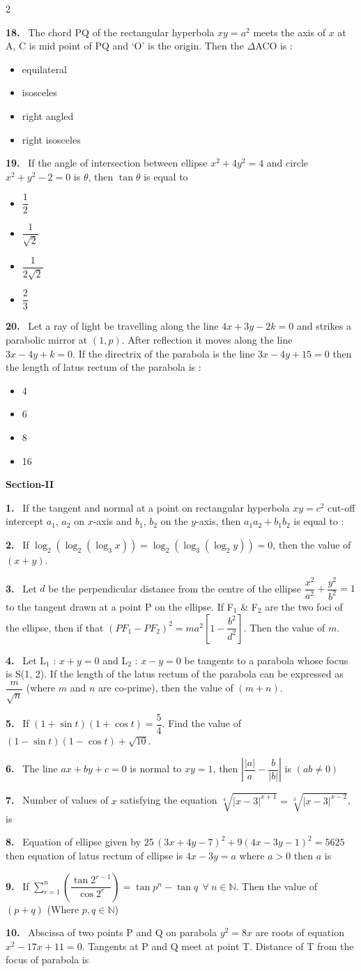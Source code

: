 \documentclass[10pt]{extarticle}
\newcommand{\sect}[1]{\par\smallskip\noindent\textbf{#1}\par}
\newcommand{\qn}[1]{\par\smallskip\noindent\textbf{#1.}~}
\newenvironment{qoptions}{\begin{itemize}[leftmargin=1.8em,itemsep=1pt,topsep=2pt,label={}]}{\end{itemize}}
\newcommand{\opt}[2]{\item[(#1)] #2}
\begin{document}
\begin{multicols}{2}
\qn{18} The chord PQ of the rectangular hyperbola $xy=a^2$ meets the axis of $x$ at A, C is mid point of PQ and `O' is the origin. Then the $\Delta$ACO is :
\begin{qoptions}
\opt{A}{equilateral}
\opt{B}{isosceles}
\opt{C}{right angled}
\opt{D}{right isosceles}
\end{qoptions}
\qn{19} If the angle of intersection between ellipse $x^2+4y^2=4$ and circle $x^2+y^2-2=0$ is $\theta$, then $\tan\theta$ is equal to
\begin{qoptions}
\opt{A}{$\dfrac12$}
\opt{B}{$\dfrac1{\sqrt2}$}
\opt{C}{$\dfrac1{2\sqrt2}$}
\opt{D}{$\dfrac23$}
\end{qoptions}
\qn{20} Let a ray of light be travelling along the line $4x+3y-2k=0$ and strikes a parabolic mirror at $(1,p)$. After reflection it moves along the line $3x-4y+k=0$. If the directrix of the parabola is the line $3x-4y+15=0$ then the length of latus rectum of the parabola is :
\begin{qoptions}
\opt{A}{4}
\opt{B}{6}
\opt{C}{8}
\opt{D}{16}
\end{qoptions}
\sect{Section-II}
\qn{1} If the tangent and normal at a point on rectangular hyperbola $xy=c^2$ cut-off intercept $a_1$, $a_2$ on $x$-axis and $b_1$, $b_2$ on the $y$-axis, then $a_1a_2+b_1b_2$ is equal to :
\qn{2} If $\log_2\left(\log_2(\log_3x)\right)=\log_2\left(\log_3(\log_2y)\right)=0$, then the value of $(x+y)$.
\qn{3} Let $d$ be the perpendicular distance from the centre of the ellipse $\dfrac{x^2}{a^2}+\dfrac{y^2}{b^2}=1$ to the tangent drawn at a point P on the ellipse. If F$_1$ \& F$_2$ are the two foci of the ellipse, then if that $(PF_1-PF_2)^2=ma^2\left[1-\dfrac{b^2}{d^2}\right]$. Then the value of $m$.
\qn{4} Let L$_1$ : $x+y=0$ and L$_2$ : $x-y=0$ be tangents to a parabola whose focus is S(1, 2). If the length of the latus rectum of the parabola can be expressed as $\dfrac m{\sqrt n}$ (where $m$ and $n$ are co-prime), then the value of $(m+n)$.
\qn{5} If $(1+\sin t)(1+\cos t)=\dfrac54$. Find the value of $(1-\sin t)(1-\cos t)+\sqrt{10}$.
\qn{6} The line $ax+by+c=0$ is normal to $xy=1$, then $\left|\dfrac{|a|}a-\dfrac b{|b|}\right|$ is $(ab\ne0)$
\qn{7} Number of values of $x$ satisfying the equation $\sqrt[4]{|x-3|^{x+1}}=\sqrt[3]{|x-3|^{x-2}}$, is
\qn{8} Equation of ellipse given by $25\,(3x+4y-7)^2+9(4x-3y-1)^2=5625$ then equation of latus rectum of ellipse is $4x-3y=a$ where $a>0$ then $a$ is
\qn{9} If $\displaystyle\sum_{r=1}^{n}\left(\dfrac{\tan2^{r-1}}{\cos2^r}\right)=\tan p^n-\tan q\ \ \forall\ n\in\mathbb N$. Then the value of $(p+q)$ (Where $p,q\in\mathbb N$)
\qn{10} Abscissa of two points P and Q on parabola $y^2=8x$ are roots of equation $x^2-17x+11=0$. Tangents at P and Q meet at point T. Distance of T from the focus of parabola is
\end{multicols}
\end{document}
